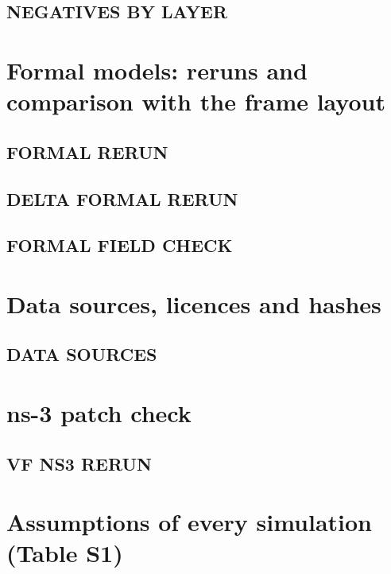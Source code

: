 \documentclass[10pt,a4paper]{article}
\begin{document}
\subsection{NEGATIVES BY LAYER}


\section{Formal models: reruns and comparison with the frame layout}

\subsection{FORMAL RERUN}


\subsection{DELTA FORMAL RERUN}


\subsection{FORMAL FIELD CHECK}


\section{Data sources, licences and hashes}

\subsection{DATA SOURCES}


\section{ns-3 patch check}

\subsection{VF NS3 RERUN}


\section{Assumptions of every simulation (Table S1)}
\end{document}
